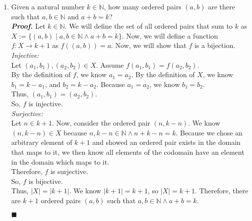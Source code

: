 \documentclass[11pt,a4paper]{article}
\begin{document}
\begin{enumerate}
    \item 
    Given a natural number $k \in \mathbb{N} $, how many ordered pairs $(a, b) $ are there such that $a, b \in \mathbb{N} $ and $a + b = k$? \bigskip \\
    \emph{\textbf{Proof.}} Let $k \in \mathbb{N} $. We will define the set of all ordered pairs that sum to $k$ as $X := \{(a, b) \mid a, b \in \mathbb{N} \land a + b = k \} $. 
    Now, we will define a function $f: X \rightarrow k + 1 $ as $f((a, b)) = a $. Now, we will show that $f$ is a bijection. \\
    \emph{Injective:} \\
    Let $(a_1, b_1), (a_2, b_2) \in X $. Assume $f(a_1, b_1) = f(a_2, b_2) $. \\
    By the definition of $f$, we know $a_1 = a_2 $. By the definition of $X$, we know $b_1 = k - a_1 $, and $b_2 = k - a_2 $. Because $a_1 = a_2 $, we know $b_1 = b_2 $. \\
    Thus, $(a_1, b_1) = (a_2, b_2) $. \\
    So, $f$ is injective. \\
    \emph{Surjective:} \\
    Let $n \in k + 1 $. Now, consider the ordered pair $(n, k - n) $. We know $(n, k - n) \in X $ because $n, k - n \in \mathbb{N} \land n + k - n = k $. 
    Because we chose an arbitrary element of $k +1$ and showed an ordered pair exists in the domain that maps to it, we then know all elements of the codomain have an element in the domain which maps to it. \\
    Therefore, $f$ is surjective. \\
    So, $f$ is bijective. \\
    Thus, $|X| = |k + 1| $. We know $|k + 1| = k + 1 $, so $|X| = k + 1 $. Therefore, there are $k + 1$ ordered pairs $(a, b) $ such that $a, b \in \mathbb{N} \land a + b = k $.
    \begin{flushright}
      $\blacksquare$
    \end{flushright}


\end{enumerate}
\end{document}

